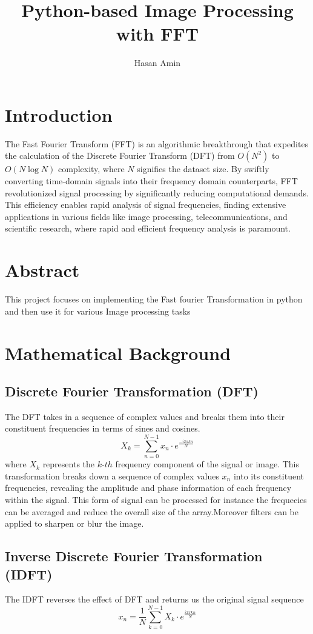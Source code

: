 \documentclass[11pt]{article}
\title{Python-based Image Processing with FFT}
\author{Hasan Amin}
\begin{document}
\maketitle

\section{Introduction}
The Fast Fourier Transform (FFT) 
is an algorithmic breakthrough 
that expedites the calculation 
of the Discrete Fourier Transform 
(DFT) from \(O(N^2)\) to \(O(N \log N)\) complexity, where \(N\) signifies the dataset size. By swiftly converting time-domain signals into their frequency domain counterparts, FFT revolutionized signal processing by significantly reducing computational demands. This efficiency enables rapid analysis of signal frequencies, finding extensive applications in various fields like image processing, telecommunications, and scientific research, where rapid and efficient frequency analysis is paramount.

\section{Abstract}
This project focuses on implementing the Fast fourier
 Transformation in python and then use it for various
  Image processing tasks

\section{Mathematical Background}
\subsection{Discrete Fourier Transformation (DFT)}
The DFT takes in a sequence of complex values and breaks them into their constituent frequencies in terms of sines and cosines.
\[ X_k = \sum_{n=0}^{N-1} x_n \cdot e^{\frac{-i2\pi kn}{N}} \] where $X_k$ represents the \(k\)-\(th\)
frequency component of the signal or image. This transformation breaks down a sequence of complex values $x_n$ into its constituent frequencies, revealing the amplitude and phase information of each frequency within the signal. This form of signal can be processed for instance the frequecies can be averaged and reduce the overall size of the array.Moreover filters can be applied to sharpen or blur the image. %

\subsection{Inverse Discrete Fourier Transformation (IDFT)}
The IDFT reverses the effect of DFT and returns us the original signal sequence
\[ x_n = \frac{1}{N}\sum_{k=0}^{N-1} X_k \cdot e^{\frac{i2\pi kn}{N}} \]
\end{document}
